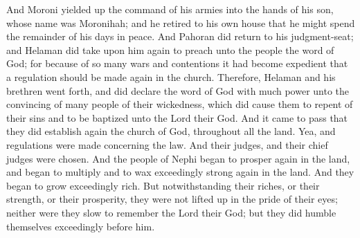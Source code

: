 \bverse \iffalse And Moroni yielded up the command of his armies into the hands of his son, whose name was Moronihah; and he retired to his own house that he might spend the remainder of his days in peace. \fi
And Moroni yielded up the command of his armies into the hands of his son, whose name was Moronihah; and he retired to his own house that he might spend the remainder of his days in peace.
\bverse \iffalse And Pahoran did return to his judgment-seat; and Helaman did take upon him again to preach unto the people the word of God; for because of so many wars and contentions it had become expedient that a regulation should be made again in the church. \fi
And Pahoran did return to his judgment-seat; and Helaman did take upon him again to preach unto the people the word of God; for because of so many wars and contentions it had become expedient that a regulation should be made again in the church.
\bverse \iffalse Therefore, Helaman and his brethren went forth, and did declare the word of God with much power unto the convincing of many people of their wickedness, which did cause them to repent of their sins and to be baptized unto the Lord their God. \fi
Therefore, Helaman and his brethren went forth, and did declare the word of God with much power unto the convincing of many people of their wickedness, which did cause them to repent of their sins and to be baptized unto the Lord their God.
\bverse \iffalse And it came to pass that they did establish again the church of God, throughout all the land. \fi
And it came to pass that they did establish again the church of God, throughout all the land.
\bverse \iffalse Yea, and regulations were made concerning the law. And their judges, and their chief judges were chosen. \fi
Yea, and regulations were made concerning the law. And their judges, and their chief judges were chosen.
\bverse \iffalse And the people of Nephi began to prosper again in the land, and began to multiply and to wax exceedingly strong again in the land. And they began to grow exceedingly rich. \fi
And the people of Nephi began to prosper again in the land, and began to multiply and to wax exceedingly strong again in the land. And they began to grow exceedingly rich.
\bverse \iffalse But notwithstanding their riches, or their strength, or their prosperity, they were not lifted up in the pride of their eyes; neither were they slow to remember the Lord their God; but they did humble themselves exceedingly before him. \fi
But notwithstanding their riches, or their strength, or their prosperity, they were not lifted up in the pride of their eyes; neither were they slow to remember the Lord their God; but they did humble themselves exceedingly before him.
